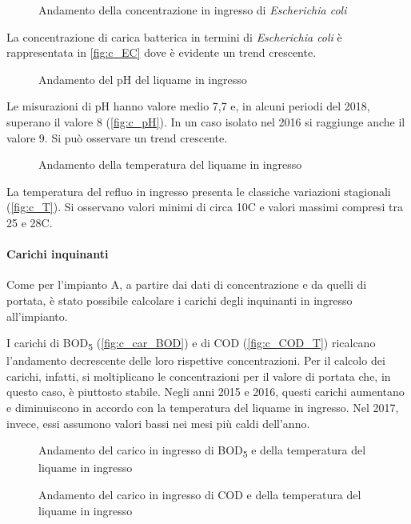 \begin{figure}
	\fbox{\texttt{[image: c\_EC]}}	\centering
	\caption{Andamento della concentrazione in ingresso di \textit{Escherichia coli}}
	\label{fig:c_EC}
\end{figure}

La concentrazione di carica batterica in termini di \textit{Escherichia coli} è rappresentata in \autoref{fig:c_EC} dove è evidente un trend crescente.

\begin{figure}
	\fbox{\texttt{[image: c\_pH]}}	\centering
	\caption{Andamento del pH del liquame in ingresso}
	\label{fig:c_pH}
\end{figure}

Le misurazioni di pH hanno valore medio 7,7 e, in alcuni periodi del 2018, superano il valore 8 (\autoref{fig:c_pH}). In un caso isolato nel 2016 si raggiunge anche il valore 9. Si può osservare un trend crescente.
\begin{figure}
	\fbox{\texttt{[image: c\_T]}}	\centering
	\caption{Andamento della temperatura del liquame in ingresso}
	\label{fig:c_T}
\end{figure}

La temperatura del refluo in ingresso presenta le classiche variazioni stagionali (\autoref{fig:c_T}).
Si osservano valori minimi di circa 10\textdegree C e valori massimi compresi tra 25 e 28\textdegree C.

\paragraph{{Carichi inquinanti}}

Come per l'impianto A, a partire dai dati di concentrazione e da quelli di portata, è stato possibile calcolare i carichi degli inquinanti in ingresso all'impianto.

I carichi di BOD\textsubscript{5} (\autoref{fig:c_car_BOD}) e di COD (\autoref{fig:c_COD_T}) ricalcano l'andamento decrescente delle loro rispettive concentrazioni. Per il calcolo dei carichi, infatti, si moltiplicano le concentrazioni per il valore di portata che, in questo caso, è piuttosto stabile.
Negli anni 2015 e 2016, questi carichi aumentano e diminuiscono in accordo con la temperatura del liquame in ingresso. Nel 2017, invece, essi assumono valori bassi nei mesi più caldi dell'anno.

\begin{figure}[H]
		\centering
	\caption{Andamento del carico in ingresso di BOD\textsubscript{5} e della temperatura del liquame in ingresso}
	\label{fig:c_car_BOD}
\end{figure}
\begin{figure}[H]
		\centering
	\caption{Andamento del carico in ingresso di COD e della temperatura del liquame in ingresso}
	\label{fig:c_COD_T}
\end{figure}

